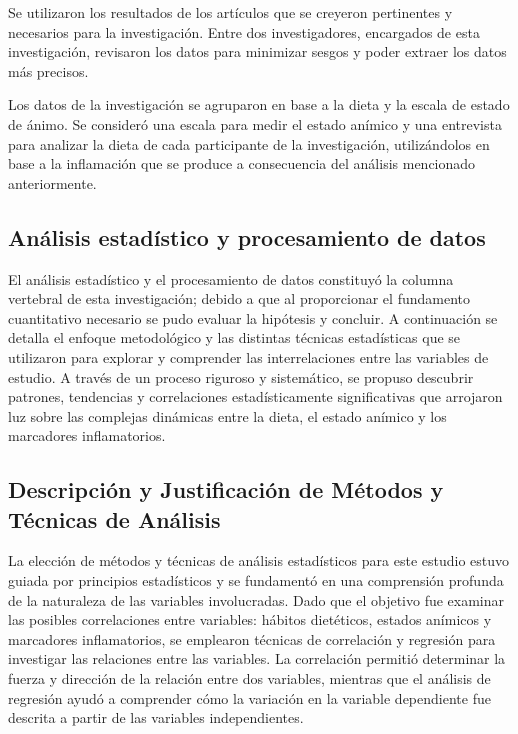\documentclass[man]{apa7}
\begin{document}
	Se utilizaron los resultados de los artículos que se creyeron
	pertinentes y necesarios para la investigación. Entre dos
	investigadores, encargados de esta investigación, revisaron los datos
	para minimizar sesgos y poder extraer los datos más precisos.

	Los datos de la investigación se agruparon en base a la dieta y la
	escala de estado de ánimo. Se consideró una escala para medir el estado
	anímico y una entrevista para analizar la dieta de cada participante de
	la investigación, utilizándolos en base a la inflamación que se produce
	a consecuencia del análisis mencionado anteriormente.

	\subsection{Análisis estadístico y procesamiento de datos}

	El análisis estadístico y el procesamiento de datos constituyó la
	columna vertebral de esta investigación; debido a que al proporcionar el
	fundamento cuantitativo necesario se pudo evaluar la hipótesis y
	concluir. A continuación se detalla el enfoque metodológico y las
	distintas técnicas estadísticas que se utilizaron para explorar y comprender
	las interrelaciones entre las variables de estudio. A través de un
	proceso riguroso y sistemático, se propuso descubrir patrones,
	tendencias y correlaciones estadísticamente significativas que arrojaron
	luz sobre las complejas dinámicas entre la dieta, el estado anímico y
	los marcadores inflamatorios.

	\subsection{Descripción y Justificación de Métodos y Técnicas de Análisis}\label{descripciuxf3n-y-justificaciuxf3n-de-muxe9todos-y-tuxe9cnicas-de-anuxe1lisis}

	La elección de métodos y técnicas de análisis estadísticos para este
	estudio estuvo guiada por principios estadísticos y se fundamentó en una
	comprensión profunda de la naturaleza de las variables involucradas.
	Dado que el objetivo fue examinar las posibles correlaciones entre
	variables: hábitos dietéticos, estados anímicos y marcadores
	inflamatorios, se emplearon técnicas de correlación y regresión para
	investigar las relaciones entre las variables. La correlación permitió
	determinar la fuerza y dirección de la relación entre dos
	variables, mientras que el análisis de regresión ayudó a
	comprender cómo la variación en la variable dependiente fue descrita a
	partir de las variables independientes.\\
\end{document}
